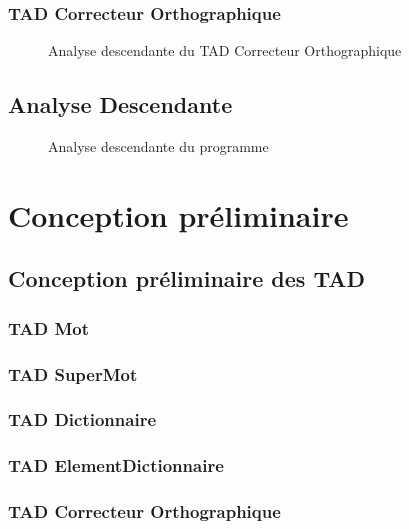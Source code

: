 \documentclass[12pt,titlepage,a4paper]{report}
\newcommand{\inputAnalyse}[1]{}
\newcommand{\inputCP}[1]{}
\begin{document}
\section{TAD Correcteur Orthographique}		\inputAnalyse{TADCorrecteurOrthographique}
	
\newpage
\begin{figure}
	\centering
	
	\caption{\label{analsye_descendante_TAD_correcteur}Analyse descendante du TAD Correcteur Orthographique}	
\end{figure}

\chapter{Analyse Descendante}
\begin{figure}[b]
	\centering
		
	\caption{\label{analyse_descendante}Analyse descendante du programme}
\end{figure}


\part{Conception préliminaire}
\chapter{Conception préliminaire des TAD}
\minitoc
	\section{TAD Mot}												\inputCP{TADMot}
	\section{TAD SuperMot}											\inputCP{TADSuperMot}
	\section{TAD Dictionnaire}										\inputCP{TADDictionnaire}
	\section{TAD ElementDictionnaire}								\inputCP{TADElementDictionnaire}
	\section{TAD Correcteur Orthographique}							\inputCP{TADCorrecteurOrthographique}
\end{document}
